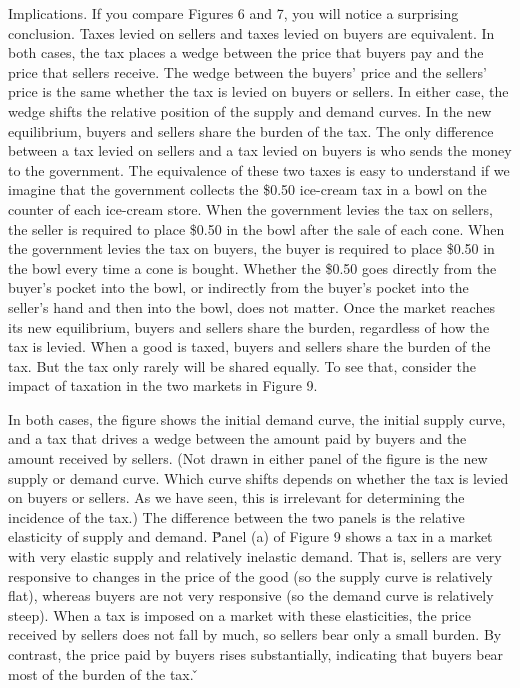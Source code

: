 Implications. If you compare Figures 6 and 7, you will notice a surprising conclusion. Taxes levied on sellers and
taxes levied on buyers are equivalent. In both cases, the tax places a wedge between the price that buyers pay and
the price that sellers receive. The wedge between the buyers' price and the sellers' price is the same whether the
tax is levied on buyers or sellers. In either case, the wedge shifts the relative position of the supply and demand
curves. In the new equilibrium, buyers and sellers share the burden of the tax. The only difference between a tax
levied on sellers and a tax levied on buyers is who sends the money to the government. The equivalence of these two
taxes is easy to understand if we imagine that the government collects the \$0.50 ice-cream tax in a bowl on the
counter of each ice-cream store. When the government levies the tax on sellers, the seller is required to place \$0.50
in the bowl after the sale of each cone. When the government levies the tax on buyers, the buyer is required to
place \$0.50 in the bowl every time a cone is bought. Whether the \$0.50 goes directly from the buyer's pocket into
the bowl, or indirectly from the buyer's pocket into the seller's hand and then into the bowl, does not matter. Once
the market reaches its new equilibrium, buyers and sellers share the burden, regardless of how the tax is levied. \v

When a good is taxed, buyers and sellers share the burden of the tax. But the tax only rarely will be shared equally.
To see that, consider the impact of taxation in the two markets in Figure 9.


In both cases, the figure shows the initial demand curve, the initial supply curve, and a tax that drives a wedge
between the amount paid by buyers and the amount received by sellers. (Not drawn in either panel of the figure is the
new supply or demand curve. Which curve shifts depends on whether the tax is levied on buyers or sellers. As we have
seen, this is irrelevant for determining the incidence of the tax.) The difference between the two panels is the
relative elasticity of supply and demand. \v

Panel (a) of Figure 9 shows a tax in a market with very elastic supply and relatively inelastic demand. That is,
sellers are very responsive to changes in the price of the good (so the supply curve is relatively flat), whereas
buyers are not very responsive (so the demand curve is relatively steep). When a tax is imposed on a market with
these elasticities, the price received by sellers does not fall by much, so sellers bear only a small burden. By
contrast, the price paid by buyers rises substantially, indicating that buyers bear most of the burden of the tax. \v

